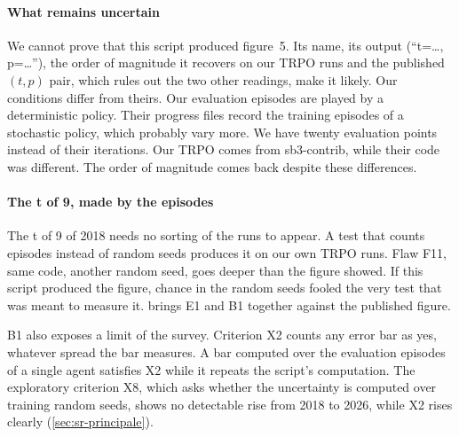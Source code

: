 \paragraph{What remains uncertain}
We cannot prove that this script produced figure~5. Its name, its output (\enquote{t=\dots, p=\dots}), the
order of magnitude it recovers on our TRPO runs and the published $(t,p)$ pair, which rules out the two other
readings, make it likely. Our conditions differ from theirs. Our
evaluation episodes are played by a deterministic policy. Their progress files record the training episodes
of a stochastic policy, which probably vary more. We have twenty evaluation points instead of their
iterations. Our TRPO comes from sb3-contrib, while their code was different. The order of magnitude comes back
despite these differences.

\paragraph{The t of 9, made by the episodes}
The t of 9 of 2018 needs no sorting of the runs to appear. A test that counts episodes instead of random seeds
produces it on our own TRPO runs. Flaw F11, same code, another random seed, goes deeper than the figure
showed. If this script produced the figure, chance in the random seeds fooled the very test that was meant to
measure it. 
brings E1 and B1 together against the published figure.

B1 also exposes a limit of the survey. Criterion X2 counts any error bar as yes, whatever spread the bar
measures. A bar computed over the evaluation episodes of a single agent satisfies X2 while it repeats the
script's computation. The exploratory criterion X8, which asks whether the uncertainty is computed over
training random seeds, shows no detectable rise from 2018 to 2026, while X2 rises clearly
(\cref{sec:sr-principale}).


